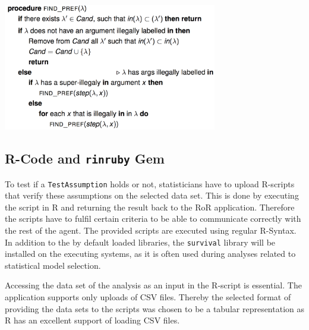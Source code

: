 \begin{algorithm}[hbtp]
	\includegraphics[width=0.7\textwidth]{figures/af_labelling}
	\caption{Algorithm to compute preferred labellings $\lambda \in $ \texttt{Cand} for \glspl{AF} \cite{rodrigues}.}
	\label{fig:af_algo}
\end{algorithm}



\subsection{R-Code and \texttt{rinruby} Gem}
\label{sec:r_code}

To test if a \texttt{TestAssumption} holds or not, statisticians have to upload \gls{R}-scripts that verify these assumptions on the selected data set. This is done by executing the script in \gls{R} and returning the result back to the \gls{RoR} application. Therefore the scripts have to fulfil certain criteria to be able to communicate correctly with the rest of the agent. The provided scripts are executed using regular R-Syntax. In addition to the by default loaded libraries, the \texttt{survival} library will be installed on the executing systems, as it is often used during analyses related to statistical model selection.

Accessing the data set of the analysis as an input in the R-script is essential. The application supports only uploads of CSV files. Thereby the selected format of providing the data sets to the scripts was chosen to be a tabular representation as \gls{R} has an excellent support of loading CSV files.

\begin{listing}[tbp]
	\caption{R-script to evaluate a \texttt{TestAssumption} on a data set to check whether the underlying data set has been mild censored or not. The performance measurement of CD1 relies on this check (see \autoref{tab:cd1}). }
	\label{lst:cd_mild}
\end{listing}


